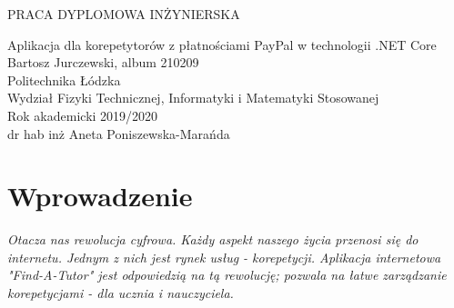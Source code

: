 \documentclass[12pt]{article}
\numberwithin{figure}{section}
\begin{document}
\begin{sloppypar}
\begin{titlepage}
 \thispagestyle{empty}
 \begin{center}
  \vspace{3cm}
  \large
    PRACA DYPLOMOWA INŻYNIERSKA\\
  \vspace{5cm}

  \Huge
    Aplikacja dla korepetytorów z płatnościami PayPal w technologii .NET Core\\
  \large
  \vspace{2cm}
  Bartosz Jurczewski, album 210209\\
  \bigbreak
  Politechnika Łódzka\\
  Wydział Fizyki Technicznej, Informatyki i Matematyki Stosowanej\\
  Rok akademicki 2019/2020\\
  \bigbreak
   dr hab inż Aneta Poniszewska-Marańda \\
 \end{center}
\end{titlepage}

\clearpage
{}
\setcounter{page}{1}
\setcounter{secnumdepth}{3}

\tableofcontents
\pagebreak

\pagebreak
\section{Wprowadzenie}
\textit{Otacza nas rewolucja cyfrowa. Każdy aspekt naszego życia przenosi się do internetu. Jednym z nich jest rynek usług - korepetycji. Aplikacja internetowa "Find-A-Tutor" jest odpowiedzią na tą rewolucję; pozwala na łatwe zarządzanie korepetycjami - dla ucznia i nauczyciela.}

\end{sloppypar}
\end{document}
